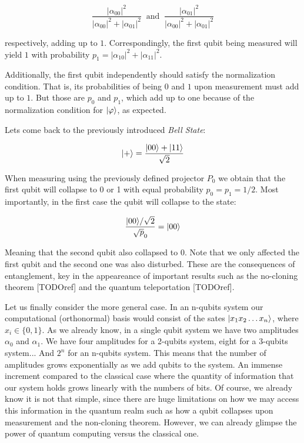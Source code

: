 $$ \frac{ |\alpha_{00}|^2 }{ |\alpha_{00}|^2 + |\alpha_{01}|^2 }  \ \text{ and } \ 
\frac{ |\alpha_{01}|^2 }{ |\alpha_{00}|^2 + |\alpha_{01}|^2 } $$

respectively, adding up to $1$. Correspondingly, the first qubit being measured will yield $1$ with probability $p_1 = |\alpha_{10}|^2 + |\alpha_{11}|^2$.

Additionally, the first qubit independently should satisfy the normalization condition. That is, its probabilities of being $0$ and $1$ upon measurement must add up to $1$. But those are $p_0$ and $p_1$, which add up to one because of the normalization condition for $|\varphi\rangle$, as expected.

Lets come back to the previously introduced \emph{Bell State}:

$$ |+\rangle = \frac{ |00\rangle + |11\rangle }{ \sqrt 2 } $$

When measuring using the previously defined projector $P_0$ we obtain that the first qubit will collapse to 0 or 1 with equal probability $p_0 = p_1 = 1/2$. Most importantly, in the first case the qubit will collapse to the state:

$$ \frac{ |00\rangle / \sqrt 2 }{ \sqrt p_0 } = |00\rangle $$

Meaning that the second qubit also collapsed to 0. Note that we only affected the first qubit and the second one was also disturbed. These are the consequences of entanglement, key in the appeareance of important results such as the no-cloning theorem [TODOref] and the quantum teleportation [TODOref].

Let us finally consider the more general case. In an n-qubits system our computational (orthonormal) basis would consist of the sates $|x_1 x_2 \dotsc x_n\rangle$, where $x_i \in \{0,1\}$. As we already know, in a single qubit system we have two amplitudes $\alpha_0$ and $\alpha_1$. We have four amplitudes for a 2-qubits system, eight for a 3-qubits system... And $2^n$ for an n-qubits system. This means that the number of amplitudes grows exponentially as we add qubits to the system. An immense increment compared to the classical case where the quantity of information that our system holds grows linearly with the numbers of bits. Of course, we already know it is not that simple, since there are huge limitations on how we may access this information in the quantum realm such as how a qubit collapses upon measurement and the non-cloning theorem. However, we can already glimpse the power of quantum computing versus the classical one.



